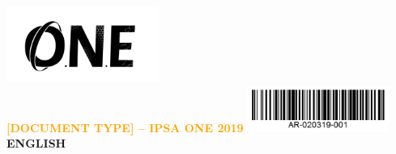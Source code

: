 \documentclass[12pt, a4paper, openright]{report}
\begin{document}
	
		\pagestyle{pagedegarde}
		\sffamily
		\hfill\includegraphics[height=2.5cm]{logooneblack}\\
		\noindent\textbf{\textcolor{orange}{[DOCUMENT TYPE] – IPSA ONE 2019}}\hfill
		\includegraphics[height=1.5cm]{codebarre}\\
		\textbf{\textcolor{vertONE}{ENGLISH}} \\
		
		\vspace*{5pt}
		
\end{document}
